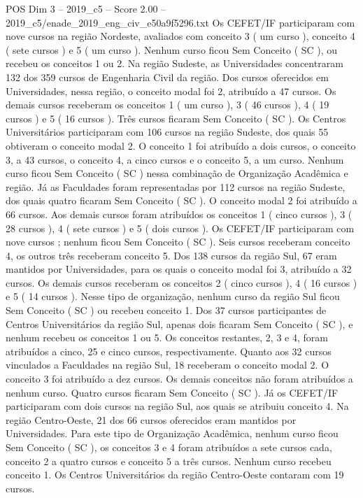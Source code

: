 \begin{textsample}{POS Dim 3 – 2019\_c5 – Score 2.00 – 2019\_c5/enade\_2019\_eng\_civ\_e50a9f5296.txt}
Os CEFET/IF participaram com nove cursos na região Nordeste, avaliados com conceito 3 ( um curso ), conceito 4 ( sete cursos ) e 5 ( um curso ).
Nenhum curso ficou Sem Conceito ( SC ), ou recebeu os conceitos 1 ou 2.
Na região Sudeste, as Universidades concentraram 132 dos 359 cursos de Engenharia Civil da região.
Dos cursos oferecidos em Universidades, nessa região, o conceito modal foi 2, atribuído a 47 cursos.
Os demais cursos receberam os conceitos 1 ( um curso ), 3 ( 46 cursos ), 4 ( 19 cursos ) e 5 ( 16 cursos ).
Três cursos ficaram Sem Conceito ( SC ).
Os Centros Universitários participaram com 106 cursos na região Sudeste, dos quais 55 obtiveram o conceito modal 2.
O conceito 1 foi atribuído a dois cursos, o conceito 3, a 43 cursos, o conceito 4, a cinco cursos e o conceito 5, a um curso.
Nenhum curso ficou Sem Conceito ( SC ) nessa combinação de Organização Acadêmica e região.
Já as Faculdades foram representadas por 112 cursos na região Sudeste, dos quais quatro ficaram Sem Conceito ( SC ).
O conceito modal 2 foi atribuído a 66 cursos.
Aos demais cursos foram atribuídos os conceitos 1 ( cinco cursos ), 3 ( 28 cursos ), 4 ( sete cursos ) e 5 ( dois cursos ).
Os CEFET/IF participaram com nove cursos ; nenhum ficou Sem Conceito ( SC ).
Seis cursos receberam conceito 4, os outros três receberam conceito 5.
Dos 138 cursos da região Sul, 67 eram mantidos por Universidades, para os quais o conceito modal foi 3, atribuído a 32 cursos.
Os demais cursos receberam os conceitos 2 ( cinco cursos ), 4 ( 16 cursos ) e 5 ( 14 cursos ).
Nesse tipo de organização, nenhum curso da região Sul ficou Sem Conceito ( SC ) ou recebeu conceito 1.
Dos 37 cursos participantes de Centros Universitários da região Sul, apenas dois ficaram Sem Conceito ( SC ), e nenhum recebeu os conceitos 1 ou 5.
Os conceitos restantes, 2, 3 e 4, foram atribuídos a cinco, 25 e cinco cursos, respectivamente.
Quanto aos 32 cursos vinculados a Faculdades na região Sul, 18 receberam o conceito modal 2.
O conceito 3 foi atribuído a dez cursos.
Os demais conceitos não foram atribuídos a nenhum curso.
Quatro cursos ficaram Sem Conceito ( SC ).
Já os CEFET/IF participaram com dois cursos na região Sul, aos quais se atribuiu conceito 4.
Na região Centro-Oeste, 21 dos 66 cursos oferecidos eram mantidos por Universidades.
Para este tipo de Organização Acadêmica, nenhum curso ficou Sem Conceito ( SC ), os conceitos 3 e 4 foram atribuídos a sete cursos cada, conceito 2 a quatro cursos e conceito 5 a três cursos.
Nenhum curso recebeu conceito 1.
Os Centros Universitários da região Centro-Oeste contaram com 19 cursos.

\end{textsample}

